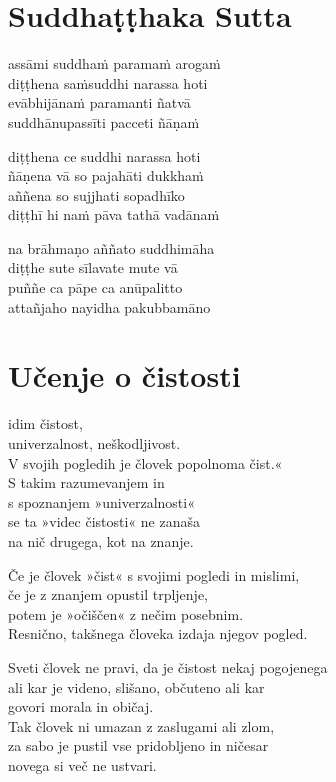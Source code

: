 

\cleartoverso
\chapter*{Suddhaṭṭhaka Sutta}

assāmi suddhaṁ paramaṁ arogaṁ\\
diṭṭhena saṁsuddhi narassa hoti\\
evābhijānaṁ paramanti ñatvā\\
suddhānupassīti pacceti ñāṇaṁ

diṭṭhena ce suddhi narassa hoti\\
ñāṇena vā so pajahāti dukkhaṁ\\
aññena so sujjhati sopadhīko\\
diṭṭhī hi naṁ pāva tathā vadānaṁ

na brāhmaṇo aññato suddhimāha\\
diṭṭhe sute sīlavate mute vā\\
puññe ca pāpe ca anūpalitto\\
attañjaho nayidha pakubbamāno


\cleartorecto
\chapter{Učenje o čistosti}

idim čistost,\\ univerzalnost, neškodljivost.\\
V svojih pogledih je človek popolnoma čist.«\\
S takim razumevanjem in\\\vin s spoznanjem »univerzalnosti«\\
se ta »videc čistosti« ne zanaša\\\vin na nič drugega, kot na znanje.

Če je človek »čist« s svojimi pogledi in mislimi,\\
če je z znanjem opustil trpljenje,\\
potem je »očiščen« z nečim posebnim.\\
Resnično, takšnega človeka izdaja njegov pogled.

Sveti človek ne pravi, da je čistost nekaj pogojenega\\
ali kar je videno, slišano, občuteno ali kar\\\vin govori morala in običaj.\\
Tak človek ni umazan z zaslugami ali zlom,\\
za sabo je pustil vse pridobljeno in ničesar\\\vin novega si več ne ustvari.

